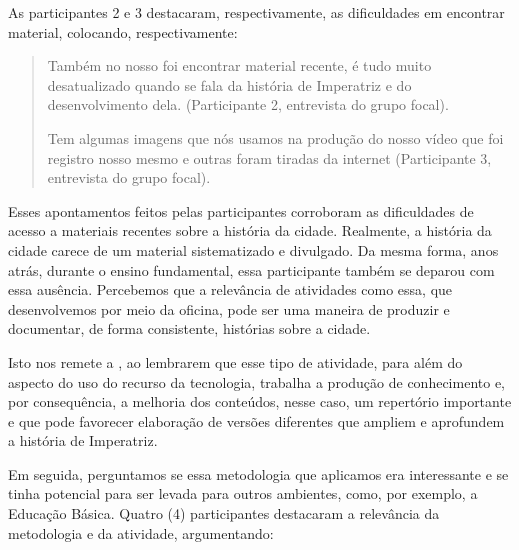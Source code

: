 \documentclass[portuguese]{textolivre}
\begin{document}
As participantes 2 e 3 destacaram, respectivamente, as dificuldades em encontrar material, colocando, respectivamente:

\begin{quote}
    Também no nosso foi encontrar material recente, é tudo muito desatualizado quando se fala da história de Imperatriz e do desenvolvimento dela. (Participante 2, entrevista do grupo focal).

    Tem algumas imagens que nós usamos na produção do nosso vídeo que foi registro nosso mesmo e outras foram tiradas da internet (Participante 3, entrevista do grupo focal).
\end{quote}

Esses apontamentos feitos pelas participantes corroboram as dificuldades de acesso a materiais recentes sobre a história da cidade. Realmente, a história da cidade carece de um material sistematizado e divulgado. Da mesma forma, anos atrás, durante o ensino fundamental, essa participante também se deparou com essa ausência. Percebemos que a relevância de atividades como essa, que desenvolvemos por meio da oficina, pode ser uma maneira de produzir e documentar, de forma consistente, histórias sobre a cidade.

Isto nos remete a \textcite{almeida2012integracao}, ao lembrarem que esse tipo de atividade, para além do aspecto do uso do recurso da tecnologia, trabalha a produção de conhecimento e, por consequência, a melhoria dos conteúdos, nesse caso, um repertório importante e que pode favorecer elaboração de versões diferentes que ampliem e aprofundem a história de Imperatriz.

Em seguida, perguntamos se essa metodologia que aplicamos era interessante e se tinha potencial para ser levada para outros ambientes, como, por exemplo, a Educação Básica. Quatro (4) participantes destacaram a relevância da metodologia e da atividade, argumentando:
\end{document}
